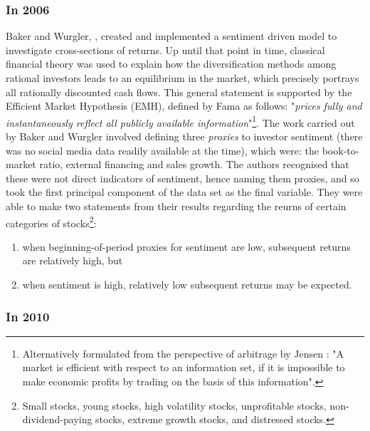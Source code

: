 \documentclass{article}
\begin{document}
\subsubsection{In 2006}
\label{sec-1-5-1}

Baker and Wurgler, \cite{JOFI:JOFI885}, created and implemented a sentiment driven model to investigate cross-sections of returns. Up until that point in time, classical financial theory was used to explain how the diversification methods among rational investors leads to an equilibrium in the market, which precisely portrays all rationally discounted cash flows. This general statement is supported by the Efficient Market Hypothesis (EMH), defined by Fama \cite{malkiel1970efficient} as follows: "\emph{prices fully and instantaneously reflect all publicly available information}"\footnote{Alternatively formulated from the perspective of arbitrage by Jensen \cite{jensen1978some}: "A market is efficient with respect to an information set, if it is impossible to make economic profits by trading on the basis of this information".}. The work carried out by Baker and Wurgler involved defining three \emph{proxies} to investor sentiment (there was no social media data readily available at the time), which were: the book-to-market ratio, external financing and sales growth. The authors recognised that these were not direct indicators of sentiment, hence naming them proxies, and so took the first principal component of the data set as the final variable.
They were able to make two statements from their results regarding the reurns of certain categories of stocks\footnote{Small stocks, young stocks, high volatility stocks, unprofitable stocks, non-dividend-paying stocks, extreme growth stocks, and distressed stocks.}:

\begin{enumerate}
\item when beginning-of-period proxies for sentiment are low, subsequent returns are relatively high, but
\item when sentiment is high, relatively low subsequent returns may be expected.
\end{enumerate}


\subsubsection{In 2010}
\label{sec-1-5-2}
\end{document}
